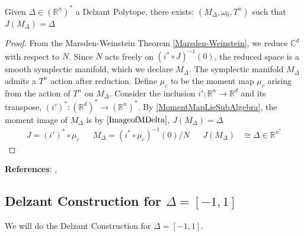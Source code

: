\begin{theorem}
Given $\Delta \in( \mathbb{R}^{n})^{*}$ a Delzant Polytope, there exists: 
$(M_{\Delta}, \omega_{0}, T^{n})$ such that $J(M_{\Delta}) = \Delta$
\end{theorem}

\begin{proof}
From the Marsden-Weinstein Theorem \ref{Marsden-Weinstein}, 
we reduce $\mathbb{C}^{d}$ with respect to $N$. Since $N$ acts freely on $(i^{*} \circ J)^{-1}(0)$, the reduced space is a smooth symplectic manifold, which we declare $M_{\Delta}$. The symplectic manifold $M_{\Delta}$ admits a $T^{n}$ action after reduction. Define $\mu_{c}$ to be the moment map $\mu_{c}$ arising from the action of $T^{n}$ on $M_{\Delta}$. Consider the inclusion $i': \mathbb{R}^{n} \to \mathbb{R}^{d}$ and its transpose, $(i')^{*}: (\mathbb{R}^{d})^{*} \to (\mathbb{R}^{n})^{*}$. By \ref{MomentMapLieSubAlgebra}, the moment image of $M_{\Delta}$ is by $\ref{ImageofMDelta}$, $J(M_{\Delta}) = \Delta$
\begin{align}
J = (i')^{*} \circ \mu_{c} && M_{\Delta} = (i^{*} \circ \mu_{c})^{-1}(0)/N && J(M_{\Delta}) &\cong \Delta \in \mathbb{R}^{n}^{*}
\end{align} 
\end{proof}

\noindent \textbf{References}: \textcite{Silva2001} \textcite{Guillemin1994}, \textcite{Terek2020}

\subsection{Delzant Construction for $\Delta = [-1,1]$}

We will do the Delzant Construction for $\Delta = [-1,1]$. 

